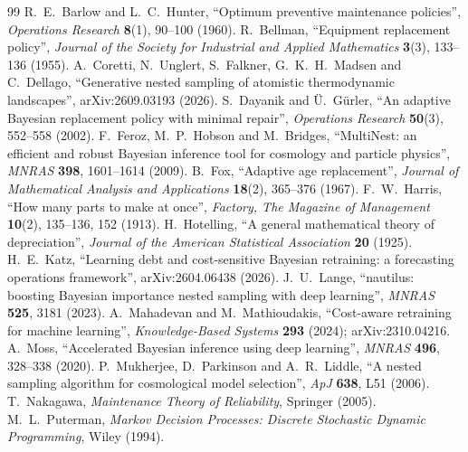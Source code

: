 \documentclass[11pt,a4paper]{article}
\begin{document}
\begin{thebibliography}{99}
 R.~E.~Barlow and L.~C.~Hunter, ``Optimum preventive maintenance policies'', \emph{Operations Research} \textbf{8}(1), 90--100 (1960).
 R.~Bellman, ``Equipment replacement policy'', \emph{Journal of the Society for Industrial and Applied Mathematics} \textbf{3}(3), 133--136 (1955).
 A.~Coretti, N.~Unglert, S.~Falkner, G.~K.~H.~Madsen and C.~Dellago, ``Generative nested sampling of atomistic thermodynamic landscapes'', arXiv:2609.03193 (2026).
 S.~Dayanik and \"U.~G\"urler, ``An adaptive Bayesian replacement policy with minimal repair'', \emph{Operations Research} \textbf{50}(3), 552--558 (2002).
 F.~Feroz, M.~P.~Hobson and M.~Bridges, ``MultiNest: an efficient and robust Bayesian inference tool for cosmology and particle physics'', \emph{MNRAS} \textbf{398}, 1601--1614 (2009).
 B.~Fox, ``Adaptive age replacement'', \emph{Journal of Mathematical Analysis and Applications} \textbf{18}(2), 365--376 (1967).
 F.~W.~Harris, ``How many parts to make at once'', \emph{Factory, The Magazine of Management} \textbf{10}(2), 135--136, 152 (1913).
 H.~Hotelling, ``A general mathematical theory of depreciation'', \emph{Journal of the American Statistical Association} \textbf{20} (1925).
 H.~E.~Katz, ``Learning debt and cost-sensitive Bayesian retraining: a forecasting operations framework'', arXiv:2604.06438 (2026).
 J.~U.~Lange, ``nautilus: boosting Bayesian importance nested sampling with deep learning'', \emph{MNRAS} \textbf{525}, 3181 (2023).
 A.~Mahadevan and M.~Mathioudakis, ``Cost-aware retraining for machine learning'', \emph{Knowledge-Based Systems} \textbf{293} (2024); arXiv:2310.04216.
 A.~Moss, ``Accelerated Bayesian inference using deep learning'', \emph{MNRAS} \textbf{496}, 328--338 (2020).
 P.~Mukherjee, D.~Parkinson and A.~R.~Liddle, ``A nested sampling algorithm for cosmological model selection'', \emph{ApJ} \textbf{638}, L51 (2006).
 T.~Nakagawa, \emph{Maintenance Theory of Reliability}, Springer (2005).
 M.~L.~Puterman, \emph{Markov Decision Processes: Discrete Stochastic Dynamic Programming}, Wiley (1994).

\end{thebibliography}
\end{document}
